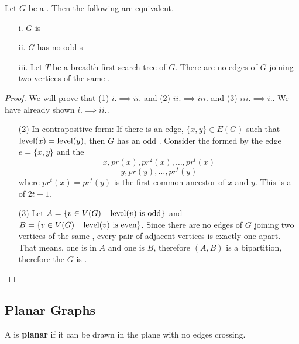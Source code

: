 \documentclass[english, 11pt]{article}
\begin{document}
\begin{thrm}
  Let $G$ be a  . Then the following are equivalent.
  \begin{itemize}
    \item[i.] $G$ is 
    \item[ii.] $G$ has no odd s
    \item[iii.] Let $T$ be a breadth first search tree of $G$. There are no edges of $G$ joining two vertices of the same .
  \end{itemize}
\end{thrm}
\begin{proof}
  We will prove that (1) $i. \implies ii.$ and (2) $ii. \implies iii.$ and (3) $iii. \implies i.$. We have already shown $i. \implies ii.$.
  \begin{itemize}
    \item[(2)] In contrapositive form: If there is an edge, $\{x,y\} \in E(G)$ such that $\operatorname{level}(x) = \operatorname{level}(y)$, then $G$ has an odd . Consider the  formed by the edge $e=\{x,y\}$ and the  \[ x, pr(x),pr^2(x),\ldots,pr^t(x) \]
    \[ y,pr(y),\ldots,pr^t(y) \]
    where $pr^t(x) = pr^t(y)$ is the first common ancestor of $x$ and $y$. This is a  of  $2t+1$.
    \item[(3)] Let $A = \{v\in V(G) \ | \ \operatorname{level}(v) \mbox{\ is odd} \}$ and $B = \{v \in V(G) \ | \ \level(v) \mbox{\ is even}\}$. Since there are no edges of $G$ joining two vertices of the same , every pair of adjacent vertices is exactly one  apart. That means, one is in $A$ and one is $B$, therefore $(A,B)$ is a bipartition, therefore the  $G$ is .
  \end{itemize}
\end{proof}

\subsection{Planar Graphs}

\begin{defn}[planar]\label{planar}
A  is \textbf{planar} if it can be drawn in the plane with no edges crossing.
\end{defn}
\end{document}

